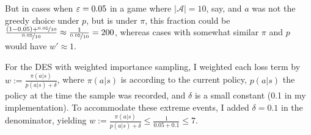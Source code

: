 \documentclass{article}
\begin{document}
But in cases when \(\varepsilon=0.05\) in a game where \(|\mathcal{A}| = 10\), say, and \(a\) was not the greedy choice under \(p\), but is under \(\pi\), this fraction could be \(\frac{(1-0.05) + \nicefrac{0.05}{10}}{\nicefrac{0.05}{10}} \approx \frac{1}{\nicefrac{0.05}{10}} = 200\), whereas cases with somewhat similar \(\pi\) and \(p\) would have \(w' \approx 1\).

For the DES with weighted importance sampling, I weighted each loss term by \(w := \frac{\pi(a|s)}{p(a|s) + \delta}\), where \(\pi(a|s)\) is according to the current policy, \(p(a|s)\) the policy at the time the sample was recorded, and \(\delta\) is a small constant (0.1 in my implementation). To accommodate these extreme events, I added \(\delta = 0.1\) in the denominator, yielding \(w := \frac{\pi(a|s)}{p(a|s) + \delta} \le \frac{1}{0.05 + 0.1} \le 7\).
\end{document}
